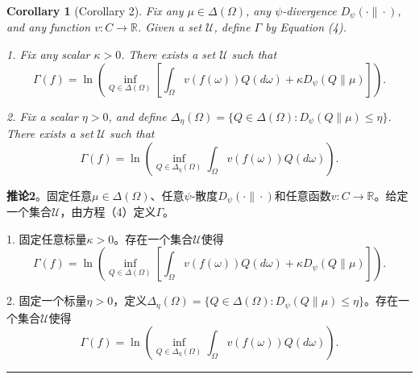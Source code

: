 \documentclass[12pt,a4paper]{article}
\newenvironment{translation}
  {\par\noindent\color{blue!70!black}\smallskip}
  {\par\medskip\hrule\medskip}
\newtheorem{corollary}[theorem]{Corollary}
\begin{document}
\begin{corollary}[Corollary 2]
Fix any $\mu \in \Delta(\Omega)$, any $\psi$-divergence $D_\psi(\cdot\|\cdot)$, and any function $v: C \to \mathbb{R}$. Given a set $\mathcal{U}$, define $\Gamma$ by Equation (4).

1. Fix any scalar $\kappa > 0$. There exists a set $\mathcal{U}$ such that
\[
\Gamma(f) = \ln\left( \inf_{Q \in \Delta(\Omega)} \left[ \int_\Omega v(f(\omega)) Q(d\omega) + \kappa D_\psi(Q\|\mu) \right] \right).
\]

2. Fix a scalar $\eta > 0$, and define $\Delta_\eta(\Omega) = \{ Q \in \Delta(\Omega) : D_\psi(Q\|\mu) \leq \eta \}$. There exists a set $\mathcal{U}$ such that
\[
\Gamma(f) = \ln\left( \inf_{Q \in \Delta_\eta(\Omega)} \int_\Omega v(f(\omega)) Q(d\omega) \right).
\]
\end{corollary}
\begin{translation}
\textbf{推论2}。固定任意$\mu \in \Delta(\Omega)$、任意$\psi$-散度$D_\psi(\cdot\|\cdot)$和任意函数$v: C \to \mathbb{R}$。给定一个集合$\mathcal{U}$，由方程（4）定义$\Gamma$。

1. 固定任意标量$\kappa > 0$。存在一个集合$\mathcal{U}$使得
\[
\Gamma(f) = \ln\left( \inf_{Q \in \Delta(\Omega)} \left[ \int_\Omega v(f(\omega)) Q(d\omega) + \kappa D_\psi(Q\|\mu) \right] \right).
\]

2. 固定一个标量$\eta > 0$，定义$\Delta_\eta(\Omega) = \{ Q \in \Delta(\Omega) : D_\psi(Q\|\mu) \leq \eta \}$。存在一个集合$\mathcal{U}$使得
\[
\Gamma(f) = \ln\left( \inf_{Q \in \Delta_\eta(\Omega)} \int_\Omega v(f(\omega)) Q(d\omega) \right).
\]
\end{translation}
\end{document}
